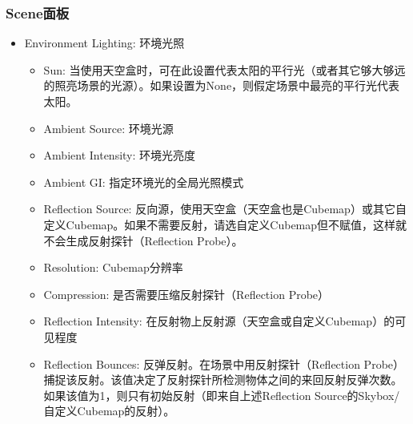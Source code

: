 \documentclass[9pt, b5paper]{article}
\begin{document}
\subsubsection{Scene面板}
\label{sec:org0139a62}
\begin{itemize}
\item Environment Lighting: 环境光照
\begin{itemize}
\item Sun: 当使用天空盒时，可在此设置代表太阳的平行光（或者其它够大够远的照亮场景的光源）。如果设置为None，则假定场景中最亮的平行光代表太阳。
\item Ambient Source: 环境光源
\item Ambient Intensity: 环境光亮度
\item Ambient GI: 指定环境光的全局光照模式
\item Reflection Source: 反向源，使用天空盒（天空盒也是Cubemap）或其它自定义Cubemap。如果不需要反射，请选自定义Cubemap但不赋值，这样就不会生成反射探针（Reflection Probe）。
\item Resolution: Cubemap分辨率
\item Compression: 是否需要压缩反射探针（Reflection Probe）
\item Reflection Intensity: 在反射物上反射源（天空盒或自定义Cubemap）的可见程度
\item Reflection Bounces: 反弹反射。在场景中用反射探针（Reflection Probe）捕捉该反射。该值决定了反射探针所检测物体之间的来回反射反弹次数。如果该值为1，则只有初始反射（即来自上述Reflection Source的Skybox/自定义Cubemap的反射）。
\end{itemize}


\end{itemize}
\end{document}
